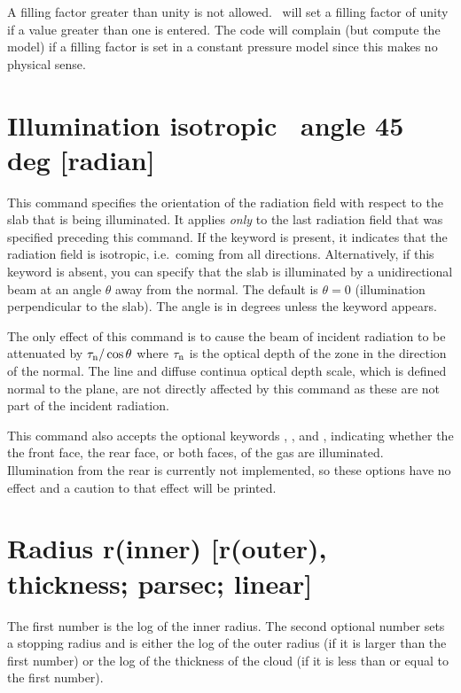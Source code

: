 A filling factor greater than unity is not allowed.  \Cloudy\ will set
a filling factor of unity if a value greater than one is entered.   The
code will complain (but compute the model) if a filling factor is set in
a constant pressure model since this makes no physical sense.

\section{Illumination isotropic \OR\ angle 45 deg [radian]}

This command specifies the orientation of the radiation field with respect
to the slab that is being illuminated. It applies {\em only}
to the last radiation field that was specified preceding this command.
If the keyword  is present, it indicates that the
radiation field is isotropic, i.e.\ coming from all directions.
Alternatively, if this keyword is absent, you can specify that the
slab is illuminated by a unidirectional beam at an angle $\theta$
away from the normal.
The default is $\theta = 0$ (illumination perpendicular to the slab).
The angle is in degrees unless
the keyword  appears.

The only effect of this command is to cause the beam of incident radiation
to be attenuated by $\tau_{\rm n} / \cos\theta$ where $\tau_{\rm n}$
is the optical depth of the zone in the direction of the normal.
The line and diffuse continua optical depth scale, which is
defined normal to the plane, are not directly affected by this command
as these are not part of the incident radiation.

This command also accepts the optional keywords ,
, and , indicating whether the
the front face, the rear face, or both faces, of the gas are illuminated.
Illumination from the rear is currently not implemented, so these options
have no effect and a caution to that effect will be printed.

\section{Radius r(inner)  [r(outer), thickness; parsec; linear]}
\label{sec:RadiusCommand}

The first number is the log of the inner radius.
The second optional
number sets a stopping radius and is either the log of the
outer radius
(if it is larger than the first number) or the log of the thickness of the
cloud (if it is less than or equal to the first number).

